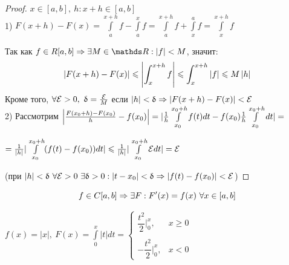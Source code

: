\documentclass[matan]{subfiles}
\begin{document}
  \begin{proof}
      $x \in [a,b],\ h:x+h \in [a,b]$
      \\
      1) $F(x+h)-F(x)= \int\limits_a^{x+h} f - \int\limits_a^x f = \int\limits_a^{x+h} f + \int\limits_x^a f = \int\limits_x^{x+h} f$

      Так как $f \in R[a,b] \Rightarrow \e M \in \R: |f|< M$, значит:
      \[\left|F(x + h) - F(x)\right| \leqslant \left|\int_x^{x + h} f \right| \leqslant \int_x^{x + h}\left|f\right| \leqslant M \left|h\right| \]
      Кроме того, $\forall \mathcal{E} > 0,\ \updelta = \frac{\mathcal{E}}{M}$ если $|h| < \updelta \Rightarrow |F(x+h)-F(x)|  < \mathcal{E}$
      \\
  2) Рассмотрим $\left|\frac{F(x_0+h)-F(x_0)}{h}-f(x_0)\right| =|\frac{1}{h} \int\limits_{x_0}^{x_0+h} f(t) dt - f(x_0) \frac{1}{h} \int\limits_{x_0}^{x_0+h} dt| =$

      $=\frac{1}{|h|} |\int\limits_{x_0}^{x_0+h} (f(t)-f(x_0)) dt| \leqslant \frac{1}{|h|}|\int\limits_{x_0}^{x_0+h} \mathcal{E} dt| = \mathcal{E}$

      (при $|h| < \updelta\ \forall \E > 0\ \e \updelta > 0: |t-x_0|<\updelta \Rightarrow |f(t)-f(x_0)|< \E$)
  \end{proof}

  \begin{Consequence}
      \[f \in C[a,b] \Rightarrow \exists F: F'(x)=f(x)\ \forall x \in [a,b]\]
  \end{Consequence}

  \begin{example}
      $f(x) = |x|,\ F(x) = \int\limits_0^x |t| dt =
       \begin{cases}
         \dfrac{t^2}{2} \Big|_0^x,& x \geqslant 0\\
         \\
         -\dfrac{t^2}{2} \Big|_0^x,& x < 0
       \end{cases}$
  \end{example}
\end{document}
